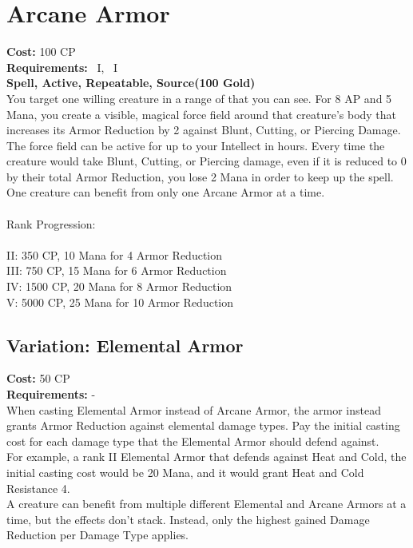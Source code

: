\section{Arcane Armor}\label{spell:arcaneArmor}
\textbf{Cost:} 100 CP\\
\textbf{Requirements:}~ I,~ I\\
\textbf{Spell, Active, Repeatable, Source(100 Gold)}\\
You target one willing creature in a range of  that you can see.
For 8 AP and 5 Mana, you create a visible, magical force field around that creature's body that increases its Armor Reduction by 2 against Blunt, Cutting, or Piercing Damage.
The force field can be active for up to your Intellect in hours.
Every time the creature would take Blunt, Cutting, or Piercing damage, even if it is reduced to 0 by their total Armor Reduction, you lose 2 Mana in order to keep up the spell.
One creature can benefit from only one Arcane Armor at a time.\\
\\
Rank Progression:\\
\\
II: 350 CP, 10 Mana for 4 Armor Reduction\\
III: 750 CP, 15 Mana for 6 Armor Reduction\\
IV: 1500 CP, 20 Mana for 8 Armor Reduction\\
V: 5000 CP, 25 Mana for 10 Armor Reduction\\

\subsection{Variation: Elemental Armor}\label{spell:elementalArmor}
\textbf{Cost:} 50 CP\\
\textbf{Requirements:} -\\
When casting Elemental Armor instead of Arcane Armor, the armor instead grants Armor Reduction against elemental damage types.
Pay the initial casting cost for each damage type that the Elemental Armor should defend against.\\
For example, a rank II Elemental Armor that defends against Heat and Cold, the initial casting cost would be 20 Mana, and it would grant Heat and Cold Resistance 4.\\
A creature can benefit from multiple different Elemental and Arcane Armors at a time, but the effects don't stack.
Instead, only the highest gained Damage Reduction per Damage Type applies.